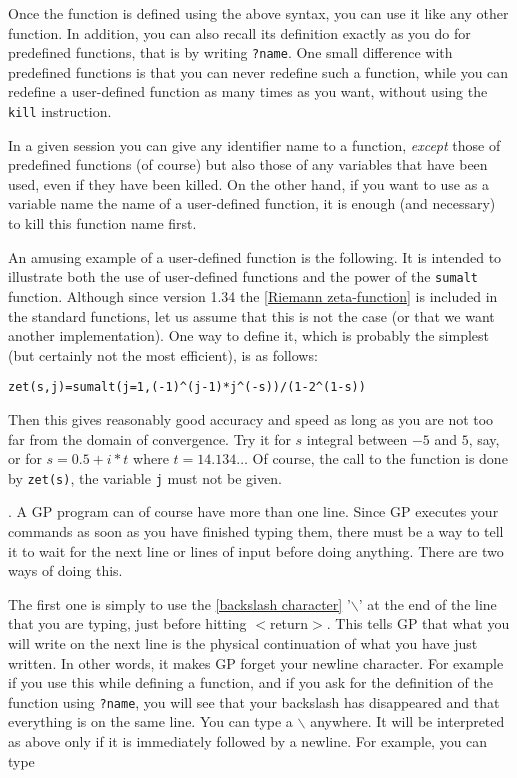 Once the function is defined using the above syntax, you can use it like any other
function. In addition, you can also recall its definition exactly as you do for
predefined functions, that is by writing {\tt ?name}. One small difference
with predefined functions is that you can never redefine such a function, while
you can redefine a user-defined function as many times as you want, without using the
{\tt kill} instruction.

In a given session you can give any identifier name to a function, {\sl except}
those of predefined functions (of course) but also those of any variables that
have been used, even if they have been killed. On the other hand, if you want
to use as a variable name the name of a user-defined function, it is enough
(and necessary) to kill this function name first.

An amusing example of a user-defined function is the following. It is intended
to illustrate both the use of
user-defined functions and the power of the {\tt sumalt} function. Although
since version 1.34 the \ref{Riemann zeta-function} is included in the standard
functions, let us assume that this is not the case (or that we want another
implementation). One way to define it, which is probably the simplest
(but certainly not the most efficient), is as follows:

{\tt zet(s,j)=sumalt(j=1,(-1)\^{}(j-1)*j\^{}(-s))/(1-2\^{}(1-s))}

Then this gives reasonably good accuracy and speed as long as you are not too far
from the domain of convergence. Try it for $s$ integral between $-5$ and $5$, say,
or for $s=0.5+i*t$ where $t=14.134\dots$ Of course, the call to the function is
done by {\tt zet(s)}, the variable {\tt j} must not be given.

. A GP program can of course have more than
one line. Since GP executes your commands as soon as you have finished typing them, there
must be a way to tell it to wait for the next line or lines of input before doing
anything. There are two ways of doing this.

The first one is simply to use the \ref{backslash character} '$\backslash$' at the end of the
line that you are typing, just before hitting $<$return$>$. This tells GP that what you
will write on the next line is the physical continuation of what you have just written.
In other words, it makes GP forget your newline character. For example if you use this
while defining a function, and if you ask for the definition of the function using
{\tt ?name}, you will see that your backslash has disappeared and that everything is on
the same line. You can type a $\backslash$ anywhere. It will be interpreted as above
only if it is immediately followed by a newline. For example, you can type

